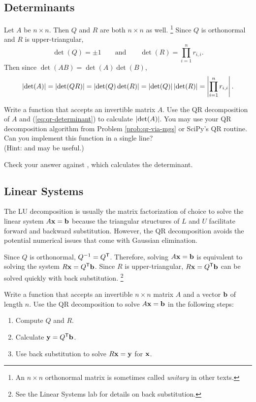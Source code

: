 \subsection*{Determinants} %

Let $A$ be $n \times n$.
Then $Q$ and $R$ are both $n \times n$ as well.%
\footnote{An $n \times n$ orthonormal matrix is sometimes called \emph{unitary} in other texts.}
Since $Q$ is orthonormal and $R$ is upper-triangular,
\[\det(Q) = \pm 1 \qquad\text{and}\qquad \det(R) = \prod_{i=1}^n r_{i,i}.\]
Then since $\det(AB) = \det(A)\det(B)$,
\begin{equation}
\label{eq:qr-determinant}
\left\lvert\det(A)\right\rvert = \left\lvert\det(QR)\right\rvert = \left\lvert\det(Q)\det(R)\right\rvert = \left\lvert\det(Q)\right\rvert\left\lvert\det(R)\right\rvert = \left\lvert\prod_{i=1}^n r_{i,i}\right\rvert.
\end{equation}

\begin{problem} %
Write a function that accepts an invertible matrix $A$.
Use the QR decomposition of $A$ and (\ref{eq:qr-determinant}) to calculate $\left\lvert\det(A)\right\rvert$.
You may use your QR decomposition algorithm from Problem \ref{prob:qr-via-mgs} or SciPy's QR routine.
Can you implement this function in a single line?
\\(Hint:  and  may be useful.)

Check your answer against , which calculates the determinant.
\end{problem}

\subsection*{Linear Systems} %

The LU decomposition is usually the matrix factorization of choice to solve the linear system $A\mathbf{x} = \mathbf{b}$ because the triangular structures of $L$ and $U$ facilitate forward and backward substitution.
However, the QR decomposition avoids the potential numerical issues that come with Gaussian elimination.

Since $Q$ is orthonormal, $Q^{-1}= Q^{\mathsf T}$.
Therefore, solving $A\mathbf{x} = \mathbf{b}$ is equivalent to solving the system $R\mathbf{x} = Q^{\mathsf T}\mathbf{b}$.
Since $R$ is upper-triangular, $R\mathbf{x} = Q^{\mathsf T}\mathbf{b}$ can be solved quickly with back substitution.%
\footnote{See the Linear Systems lab for details on back substitution.}

\begin{problem} %
Write a function that accepts an invertible $n \times n$ matrix $A$ and a vector $\mathbf{b}$ of length $n$.
Use the QR decomposition to solve $A\mathbf{x} = \mathbf{b}$ in the following steps:
\begin{enumerate}
    \item Compute $Q$ and $R$.
    \item Calculate $\mathbf{y} = Q^{\mathsf T}\mathbf{b}$.
    \item Use back substitution to solve $R\mathbf{x} = \mathbf{y}$ for $\mathbf{x}$.
\end{enumerate}
\end{problem}

